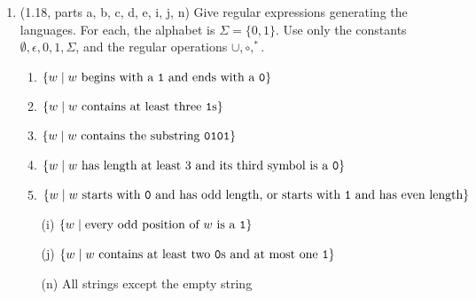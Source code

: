 \documentclass[11pt]{article}
\begin{document}
\begin{enumerate}
\item (1.18, parts a, b, c, d, e, i, j, n)
Give regular expressions generating the languages. For each, the alphabet is $\Sigma = \{0,1\}$.
Use only the constants $\emptyset, \epsilon, 0, 1, \Sigma$, and the regular operations $\cup, \circ, ^*$.
\begin{enumerate}
\item $\{w \mid w \textnormal{ begins with a {\tt 1} and ends with a {\tt 0}}\}$
\item $\{w \mid w \textnormal{ contains at least three {\tt 1}s}\}$
\item $\{w \mid w \textnormal{ contains the substring {\tt 0101}}\}$
\item $\{w \mid w \textnormal{ has length at least 3 and its third symbol is a {\tt 0}}\}$
\item $\{w \mid w \textnormal{ starts with {\tt 0} and has odd length, or starts with {\tt 1} and has even length}\}$
\item[(i)] $\{w \mid \textnormal{every odd position of $w$ is a {\tt 1}}\}$
\item[(j)] $\{w \mid w \textnormal{ contains at least two {\tt 0}s and at most one {\tt 1}}\}$
\item[(n)] All strings except the empty string
\end{enumerate}


\end{enumerate}
\end{document}
